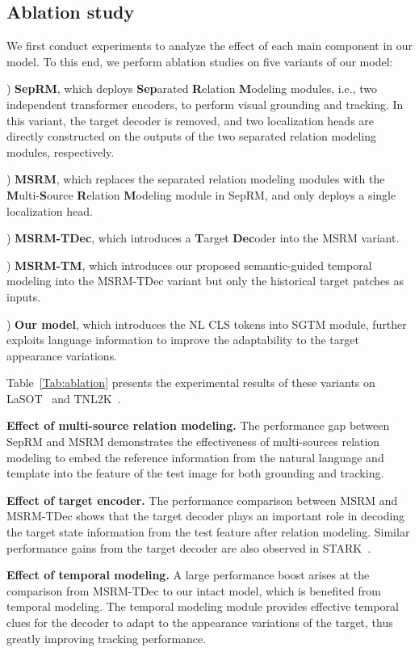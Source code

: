 \subsection{Ablation study}
We first conduct experiments to analyze the effect of each main component in our model. To this end, we perform ablation studies on five variants of our model:

) \textbf{SepRM}, which deploys \textbf{Sep}arated \textbf{R}elation \textbf{M}odeling modules, i.e., two independent transformer encoders, to perform visual grounding and tracking. In this variant, the target decoder is removed, and two localization heads are directly constructed on the outputs of the two separated relation modeling modules, respectively.

) \textbf{MSRM}, which replaces the separated relation modeling modules with the \textbf{M}ulti-\textbf{S}ource \textbf{R}elation \textbf{M}odeling module in SepRM, and only deploys a single localization head.

) \textbf{MSRM-TDec}, which introduces a \textbf{T}arget \textbf{Dec}oder into the MSRM variant.

) \textbf{MSRM-TM}, which introduces our proposed semantic-guided temporal modeling into the MSRM-TDec variant but only the historical target patches as inputs.

) \textbf{Our model}, which introduces the NL CLS tokens into SGTM module, further exploits language information to improve the adaptability to the target appearance variations.

Table~\ref{Tab:ablation} presents the experimental results of these variants on LaSOT~\cite{LASOT} and TNL2K~\cite{TNL2K}.

\noindent\textbf{Effect of multi-source relation modeling.}
The performance gap between SepRM and MSRM demonstrates the effectiveness of multi-sources relation modeling to embed the reference information from the natural language and template into the feature of the test image for both grounding and tracking.

\noindent\textbf{Effect of target encoder.}
The performance comparison between MSRM and MSRM-TDec shows that the target decoder plays an important role in decoding the target state information from the test feature after relation modeling. 
Similar performance gains from the target decoder are also observed in STARK~\cite{stark}. 

\noindent\textbf{Effect of temporal modeling.}
A large performance boost arises at the comparison from MSRM-TDec to our intact model, which is benefited from temporal modeling. 
The temporal modeling module provides effective temporal clues for the decoder to adapt to the appearance variations of the target, thus greatly improving tracking performance.

